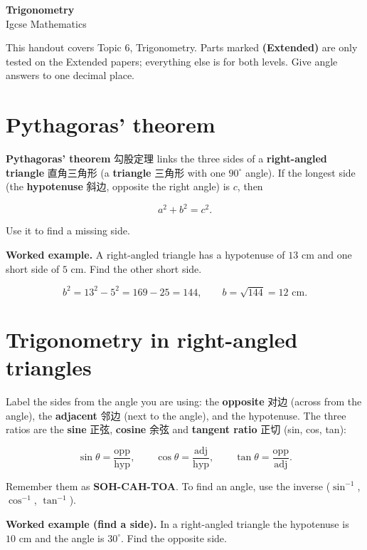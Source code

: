 \documentclass[11pt]{article}
\begin{document}
\begin{center}
  {\LARGE\bfseries Trigonometry}\\[0.35em]
  {\large Igcse Mathematics}
\end{center}
\vspace{0.6em}

This handout covers Topic 6, Trigonometry. Parts marked \textbf{(Extended)} are only tested on the Extended papers; everything else is for both levels. Give angle answers to one decimal place.

\section*{Pythagoras' theorem}

\textbf{Pythagoras' theorem} 勾股定理 links the three sides of a \textbf{right-angled triangle} 直角三角形 (a \textbf{triangle} 三角形 with one $90^{\circ}$ angle). If the longest side (the \textbf{hypotenuse} 斜边, opposite the right angle) is $c$, then

\[
a^{2} + b^{2} = c^{2}.
\]

Use it to find a missing side.

\textbf{Worked example.} A right-angled triangle has a hypotenuse of $13\text{ cm}$ and one short side of $5\text{ cm}$. Find the other short side.

\[
b^{2} = 13^{2} - 5^{2} = 169 - 25 = 144, \qquad b = \sqrt{144} = 12\text{ cm}.
\]

\section*{Trigonometry in right-angled triangles}

Label the sides from the angle you are using: the \textbf{opposite} 对边 (across from the angle), the \textbf{adjacent} 邻边 (next to the angle), and the hypotenuse. The three ratios are the \textbf{sine} 正弦, \textbf{cosine} 余弦 and \textbf{tangent ratio} 正切 (sin, cos, tan):

\[
\sin\theta = \frac{\text{opp}}{\text{hyp}}, \qquad \cos\theta = \frac{\text{adj}}{\text{hyp}}, \qquad \tan\theta = \frac{\text{opp}}{\text{adj}}.
\]

Remember them as \textbf{SOH-CAH-TOA}. To find an angle, use the inverse ($\sin^{-1}$, $\cos^{-1}$, $\tan^{-1}$).

\textbf{Worked example (find a side).} In a right-angled triangle the hypotenuse is $10\text{ cm}$ and the angle is $30^{\circ}$. Find the opposite side.
\end{document}
